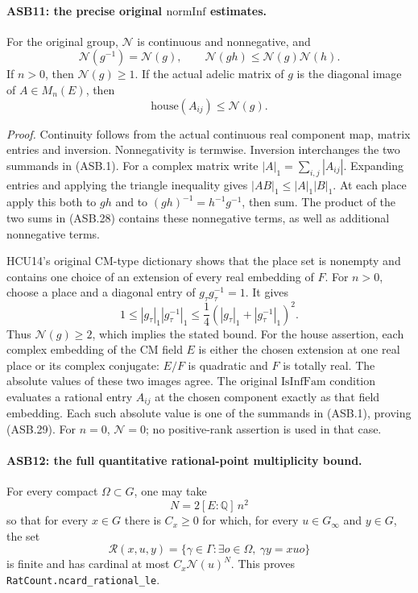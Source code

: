 \paragraph{ASB11: the precise original \(\mathrm{normInf}\) estimates.}
\label{claim:ASB11}
For the original group, \(\mathcal N\) is continuous and
nonnegative, and
\[
 \mathcal N(g^{-1})=\mathcal N(g),\qquad
 \mathcal N(gh)\le\mathcal N(g)\mathcal N(h).
 \tag{ASB.28}
\]
If \(n>0\), then \(\mathcal N(g)\ge1\).
If the actual adelic matrix of \(g\) is the diagonal image of
\(A\in M_n(E)\), then
\[
                         \mathrm{house}(A_{ij})\le\mathcal N(g).
 \tag{ASB.29}
\]

\emph{Proof.}
Continuity follows from the actual continuous real component map,
matrix entries and inversion.  Nonnegativity is termwise.
Inversion interchanges the two summands in (ASB.1).
For a complex matrix write \(|A|_1=\sum_{i,j}|A_{ij}|\).
Expanding entries and applying the triangle inequality gives
\(|AB|_1\le|A|_1|B|_1\).
At each place apply this both to \(gh\) and to
\((gh)^{-1}=h^{-1}g^{-1}\), then sum.
The product of the two sums in (ASB.28) contains these
nonnegative terms, as well as additional nonnegative terms.

HCU14's original CM-type dictionary shows that the place set is
nonempty and contains one choice of an extension of every real
embedding of \(F\).
For \(n>0\), choose a place and a diagonal entry of
\(g_\tau g_\tau^{-1}=1\).  It gives
\[
       1\le |g_\tau|_1|g_\tau^{-1}|_1
                 \le\frac14(|g_\tau|_1+|g_\tau^{-1}|_1)^2.
 \tag{ASB.30}
\]
Thus \(\mathcal N(g)\ge2\), which implies the stated bound.
For the house assertion, each complex embedding of the CM field
\(E\) is either the chosen extension at one real place or its
complex conjugate: \(E/F\) is quadratic and \(F\) is totally real.
The absolute values of these two images agree.
The original \(\mathrm{IsInfFam}\) condition evaluates a rational
entry \(A_{ij}\) at the chosen component exactly as that field
embedding.  Each such absolute value is one of the summands in
(ASB.1), proving (ASB.29).
For \(n=0\), \(\mathcal N=0\); no positive-rank assertion is
used in that case.

\paragraph{ASB12: the full quantitative rational-point multiplicity bound.}
\label{claim:ASB12}
For every compact \(\Omega\subset G\), one may take
\[
                         N=2[E:\mathbb Q]\,n^2
 \tag{ASB.31}
\]
so that for every \(x\in G\) there is \(C_x\ge0\) for which,
for every \(u\in G_\infty\) and \(y\in G\), the set
\[
 \mathcal R(x,u,y)=
 \{\gamma\in\Gamma:\exists o\in\Omega,\ \gamma y=xuo\}
 \tag{ASB.32}
\]
is finite and has cardinal at most \(C_x\mathcal N(u)^N\).
This proves
\texttt{RatCount.}\allowbreak\texttt{ncard\_rational\_le}.

